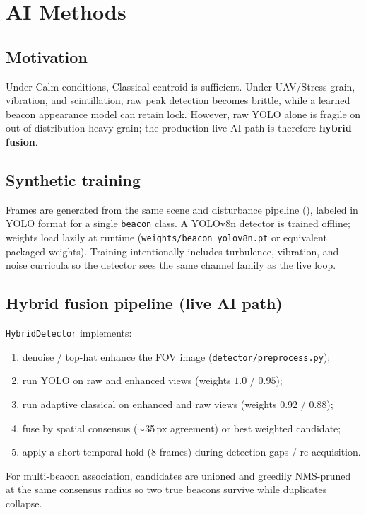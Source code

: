 \documentclass[11pt,a4paper]{article}
\begin{document}
\section{AI Methods}

\subsection{Motivation}
Under Calm conditions, Classical centroid is sufficient.
Under UAV/Stress grain, vibration, and scintillation, raw peak detection becomes brittle, while a learned beacon appearance model can retain lock.
However, raw YOLO alone is fragile on out-of-distribution heavy grain; the production live AI path is therefore \textbf{hybrid fusion}.

\subsection{Synthetic training}
Frames are generated from the same scene and disturbance pipeline (), labeled in YOLO format for a single \texttt{beacon} class.
A YOLOv8n detector is trained offline; weights load lazily at runtime (\texttt{weights/beacon\_yolov8n.pt} or equivalent packaged weights).
Training intentionally includes turbulence, vibration, and noise curricula so the detector sees the same channel family as the live loop.

\subsection{Hybrid fusion pipeline (live AI path)}
\texttt{HybridDetector} implements:
\begin{enumerate}
  \item denoise / top-hat enhance the FOV image (\texttt{detector/preprocess.py});
  \item run YOLO on raw and enhanced views (weights $1.0$ / $0.95$);
  \item run adaptive classical on enhanced and raw views (weights $0.92$ / $0.88$);
  \item fuse by spatial consensus ($\sim$35\,px agreement) or best weighted candidate;
  \item apply a short temporal hold (8 frames) during detection gaps / re-acquisition.
\end{enumerate}
For multi-beacon association, candidates are unioned and greedily NMS-pruned at the same consensus radius so two true beacons survive while duplicates collapse.
\end{document}
